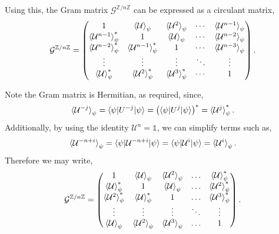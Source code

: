 \documentclass[12pt,letterpaper]{article}
\begin{document}
\begin{multicols}{2}
Using this, the Gram matrix $\mathcal{G}^{\mathbb{Z}/n\mathbb{Z}}$ can be expressed as a circulant matrix,
\begin{align*}
	\mathcal{G}^{\mathbb{Z}/n\mathbb{Z}} = \begin{pmatrix}
 1 & \braket{\mathcal{U}}_{\psi} & \braket{\mathcal{U}^2}_{\psi} & \cdots & \braket{\mathcal{U}^{n-1}}_{\psi} \\
 \braket{\mathcal{U}^{n-1}}_{\psi}^* & 1 & \braket{\mathcal{U}}_{\psi} & \cdots & \braket{\mathcal{U}^{n-2}}_{\psi} \\
 \braket{\mathcal{U}^{n-2}}_{\psi}^* & \braket{\mathcal{U}^{n-1}}_{\psi}^* & 1 & \cdots & \braket{\mathcal{U}^{n-3}}_{\psi} \\
 \vdots & \vdots & \vdots & \ddots & \vdots \\
 \braket{\mathcal{U}}_{\psi}^* & \braket{\mathcal{U}^{2}}_{\psi}^* & \braket{\mathcal{U}^{3}}_{\psi}^* & \cdots & 1
\end{pmatrix}.
\end{align*}

Note the Gram matrix is Hermitian, as required, since,
\begin{align*}
    \braket{\mathcal{U}^{-j}}_{\psi} = \braket{\psi | U^{-j} | \psi} = \left(\braket{\psi | U^j | \psi}\right)^* = \braket{\mathcal{U}^j}_{\psi}^*.
\end{align*}
Additionally, by using the identity $\mathcal{U}^n = \mathds{1}$, we can simplify terms such as,
\begin{align*}
	\braket{\mathcal{U}^{-n+i}}_\psi = \braket{\psi | \mathcal{U}^{-n+i} | \psi} = \braket{\psi | \mathcal{U}^i | \psi} = \braket{\mathcal{U}^i}_\psi.
\end{align*}
Therefore we may write,
\begin{align*}
	\mathcal{G}^{\mathbb{Z}/n\mathbb{Z}} = \begin{pmatrix}
 1 & \braket{\mathcal{U}}_{\psi} & \braket{\mathcal{U}^{2}}_{\psi} & \hdots &  \braket{\mathcal{U}}_{\psi}^* \\
  \braket{\mathcal{U}}_{\psi}^* & 1 & \braket{\mathcal{U}}_{\psi} & \hdots &  \braket{\mathcal{U}^{2}}_{\psi}^* \\
    \braket{\mathcal{U}^{2}}_{\psi}^* &  \braket{\mathcal{U}}_{\psi}^*  & 1 & \hdots &  \braket{\mathcal{U}^{3}}_{\psi}^* \\
   \vdots & \vdots & \vdots & \ddots & \vdots \\
  \braket{\mathcal{U}}_{\psi} & \braket{\mathcal{U}^{2}}_{\psi}  & \braket{\mathcal{U}^{3}}_{\psi}  & \hdots &  1 
\end{pmatrix}.
\end{align*}


\end{multicols}
\end{document}

